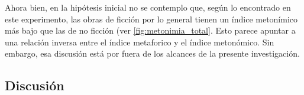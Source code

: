 \documentclass[twoside]{article}
\begin{document}
Ahora bien, en la hipótesis inicial no se contemplo que, según lo
encontrado en este experimento, las obras de ficción por lo general
tienen un índice metonímico más bajo que las de no ficción (ver \ref{fig:metonimia_total}. Esto
parece apuntar a una relación inversa entre el índice metaforico
y el índice metonómico. Sin embargo, esa discusión está por fuera
de los alcances de la presente investigación.

\subsection{Discusión}
\label{sec:org697301d}






 
\end{document}
